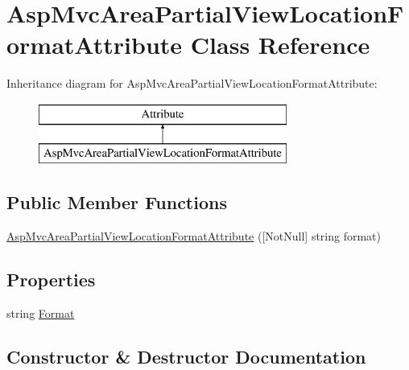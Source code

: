 \hypertarget{class_asp_mvc_area_partial_view_location_format_attribute}{}\section{Asp\+Mvc\+Area\+Partial\+View\+Location\+Format\+Attribute Class Reference}
\label{class_asp_mvc_area_partial_view_location_format_attribute}
Inheritance diagram for Asp\+Mvc\+Area\+Partial\+View\+Location\+Format\+Attribute\+:\begin{figure}[H]
\begin{center}
\leavevmode
\includegraphics[height=2.000000cm]{class_asp_mvc_area_partial_view_location_format_attribute}
\end{center}
\end{figure}
\subsection*{Public Member Functions}
\begin{DoxyCompactItemize}
\item 
\mbox{\hyperlink{class_asp_mvc_area_partial_view_location_format_attribute_a5aceafa5591494e9ff5d0d3610979db4}{Asp\+Mvc\+Area\+Partial\+View\+Location\+Format\+Attribute}} (\mbox{[}Not\+Null\mbox{]} string format)
\end{DoxyCompactItemize}
\subsection*{Properties}
\begin{DoxyCompactItemize}
\item 
string \mbox{\hyperlink{class_asp_mvc_area_partial_view_location_format_attribute_a9de8c471614445bbbcbf2051209ec446}{Format}}
\end{DoxyCompactItemize}


\subsection{Constructor \& Destructor Documentation}
\mbox{\label{class_asp_mvc_area_partial_view_location_format_attribute_a5aceafa5591494e9ff5d0d3610979db4}} 
